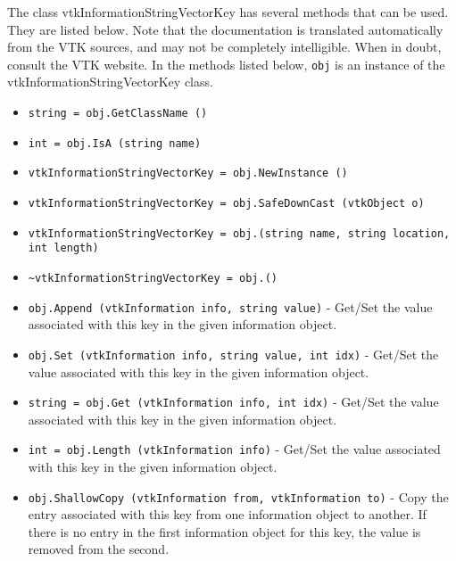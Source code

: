 The class vtkInformationStringVectorKey has several methods that can be used.
  They are listed below.
Note that the documentation is translated automatically from the VTK sources,
and may not be completely intelligible.  When in doubt, consult the VTK website.
In the methods listed below, \verb|obj| is an instance of the vtkInformationStringVectorKey class.
\begin{itemize}
\item  \verb|string = obj.GetClassName ()|

\item  \verb|int = obj.IsA (string name)|

\item  \verb|vtkInformationStringVectorKey = obj.NewInstance ()|

\item  \verb|vtkInformationStringVectorKey = obj.SafeDownCast (vtkObject o)|

\item  \verb|vtkInformationStringVectorKey = obj.(string name, string location, int length)|

\item  \verb|~vtkInformationStringVectorKey = obj.()|

\item  \verb|obj.Append (vtkInformation info, string value)| -  Get/Set the value associated with this key in the given
 information object.

\item  \verb|obj.Set (vtkInformation info, string value, int idx)| -  Get/Set the value associated with this key in the given
 information object.

\item  \verb|string = obj.Get (vtkInformation info, int idx)| -  Get/Set the value associated with this key in the given
 information object.

\item  \verb|int = obj.Length (vtkInformation info)| -  Get/Set the value associated with this key in the given
 information object.

\item  \verb|obj.ShallowCopy (vtkInformation from, vtkInformation to)| -  Copy the entry associated with this key from one information
 object to another.  If there is no entry in the first information
 object for this key, the value is removed from the second.

\end{itemize}
